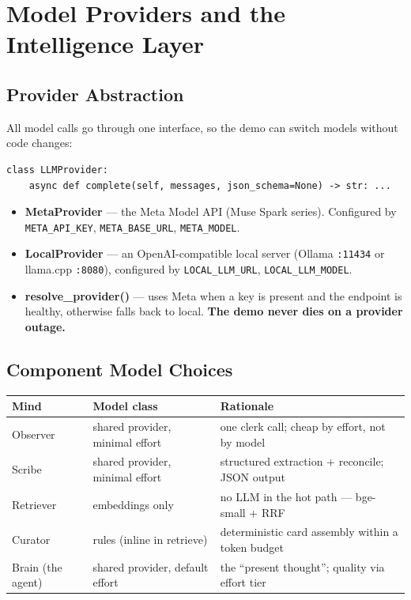 \chapter{Model Providers and the Intelligence Layer}

\section{Provider Abstraction}
All model calls go through one interface, so the demo can switch models without code changes:

\begin{Verbatim}[breaklines=true,fontsize=\small]
class LLMProvider:
    async def complete(self, messages, json_schema=None) -> str: ...
\end{Verbatim}

\begin{itemize}
  \item \textbf{MetaProvider} --- the Meta Model API (Muse Spark series). Configured by
  \texttt{META\_API\_KEY}, \texttt{META\_BASE\_URL}, \texttt{META\_MODEL}.
  \item \textbf{LocalProvider} --- an OpenAI-compatible local server (Ollama \texttt{:11434} or
  llama.cpp \texttt{:8080}), configured by \texttt{LOCAL\_LLM\_URL}, \texttt{LOCAL\_LLM\_MODEL}.
  \item \textbf{resolve\_provider()} --- uses Meta when a key is present and the endpoint is
  healthy, otherwise falls back to local. \textbf{The demo never dies on a provider outage.}
\end{itemize}

\section{Component Model Choices}
\begin{longtable}{@{}p{}p{}p{}@{}}
\toprule
Mind & Model class & Rationale \\
\midrule
Observer & shared provider, minimal effort & one clerk call; cheap by effort, not by model \\
Scribe & shared provider, minimal effort & structured extraction + reconcile; JSON output \\
Retriever & embeddings only & no LLM in the hot path --- bge-small + RRF \\
Curator & rules (inline in retrieve) & deterministic card assembly within a token budget \\
Brain (the agent) & shared provider, default effort & the ``present thought''; quality via effort tier \\
\bottomrule
\end{longtable}

